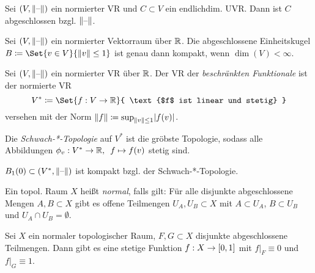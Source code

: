 \documentclass{cheat-sheet}
\begin{document}
\begin{lem}
  Sei $(V, \lVert\text{--}\rVert)$ ein normierter VR und $C \subset V$ ein endlichdim. UVR. Dann ist $C$ abgeschlossen bzgl. $\lVert\text{--}\rVert$.
\end{lem}

\begin{prop}
  Sei $(V, \lVert\text{--}\rVert)$ ein normierter Vektorraum über $\mathbb{R}$. Die abgeschlossene Einheitskugel $B \coloneqq \Set{ v \in V }{ \norm{v} \leq 1 }$ ist genau dann kompakt, wenn $\dim(V) < \infty$.
\end{prop}

\begin{defn}
  Sei $(V, \lVert\text{--}\rVert)$ ein normierter VR über $\mathbb{R}$. Der VR der \emph{beschränkten Funktionale} ist der normierte VR
  \[ V^* \coloneqq \Set{ f : V \to \R }{ \text{$f$ ist linear und stetig} } \]
  versehen mit der Norm $\lVert f\rVert \coloneqq \sup_{\lVert v\rVert \leq 1} \lvert f(v)\rvert$.
\end{defn}

\begin{defn}
  Die \emph{Schwach-*-Topologie} auf $V^*$ ist die gröbste Topologie, sodass alle Abbildungen $\phi_v : V^* \to \mathbb{R}, \enspace f \mapsto f(v)$ stetig sind.
\end{defn}

\begin{satz}
  $B_1(0) \subset (V^*, \lVert\text{--}\rVert)$ ist kompakt bzgl. der Schwach-*-Topologie.
\end{satz}


\begin{defn}
  Ein topol. Raum $X$ heißt \emph{normal}, falls gilt: Für alle disjunkte abgeschlossene Mengen $A, B \subset X$ gibt es offene Teilmengen $U_A, U_B \subset X$ mit $A \subset U_A$, $B \subset U_B$ und $U_A \cap U_B = \emptyset$.
\end{defn}

\begin{bspe}
   \quad
\end{bspe}

\begin{lem}
  Sei $X$ ein normaler topologischer Raum, $F, G \subset X$ disjunkte abgeschlossene Teilmengen. Dann gibt es eine stetige Funktion $f : X \to \left[ 0, 1 \right]$ mit $f|_F \equiv 0$ und $f|_G \equiv 1$.
\end{lem}
\end{document}
